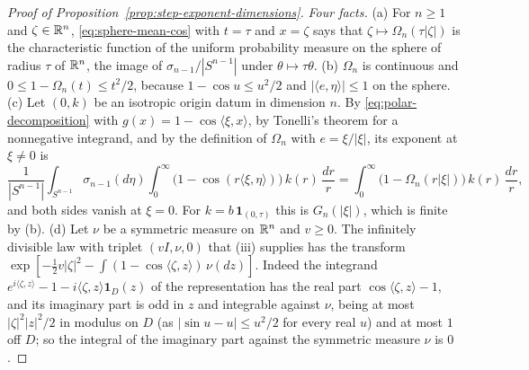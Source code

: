 \begin{proof}[Proof of Proposition~\ref{prop:step-exponent-dimensions}]
\emph{Four facts.} (a) For $n \ge 1$ and $\zeta \in \mathbb{R}^n$, \ref{eq:sphere-mean-cos} with
$t = \tau$ and $x = \zeta$ says that $\zeta \mapsto \Omega_n(\tau|\zeta|)$ is the characteristic
function of the uniform probability measure on the sphere of radius $\tau$ of $\mathbb{R}^n$, the image
of $\sigma_{n-1}/|S^{n-1}|$ under $\theta \mapsto \tau\theta$. (b) $\Omega_n$ is continuous and
$0 \le 1 - \Omega_n(t) \le t^2/2$, because $1 - \cos u \le u^2/2$ and
$|\langle e,\eta\rangle| \le 1$ on the sphere. (c) Let $(0,k)$ be an isotropic origin datum in
dimension $n$. By \ref{eq:polar-decomposition} with $g(x) = 1 - \cos\langle\xi,x\rangle$, by
Tonelli's theorem for a nonnegative integrand, and by the definition of $\Omega_n$ with
$e = \xi/|\xi|$, its exponent at $\xi \ne 0$ is
\[
  \frac{1}{|S^{n-1}|}\int_{S^{n-1}}\sigma_{n-1}(d\eta)\int_0^\infty
     \bigl(1 - \cos(r\langle\xi,\eta\rangle)\bigr)\,k(r)\,\frac{dr}{r}
   = \int_0^\infty \bigl(1 - \Omega_n(r|\xi|)\bigr)\,k(r)\,\frac{dr}{r} ,
\]
and both sides vanish at $\xi = 0$. For $k = b\,\mathbf 1_{(0,\tau)}$ this is $G_n(|\xi|)$, which
is finite by (b). (d) Let $\nu$ be a symmetric \Levy{} measure on $\mathbb{R}^n$ and $v \ge 0$. The
infinitely divisible law with triplet $(vI, \nu, 0)$ that (iii) supplies has the
transform $\exp[-\tfrac12 v|\zeta|^2 - \int(1 - \cos\langle\zeta,z\rangle)\,\nu(dz)]$. Indeed
the integrand $e^{i\langle\zeta,z\rangle} - 1 - i\langle\zeta,z\rangle\mathbf 1_D(z)$ of the
representation has the real part $\cos\langle\zeta,z\rangle - 1$, and its imaginary part is odd
in $z$ and integrable against $\nu$, being at most $|\zeta|^2|z|^2/2$ in modulus on $D$ (as
$|\sin u - u| \le u^2/2$ for every real $u$) and at most $1$ off $D$; so the integral of the
imaginary part against the symmetric measure $\nu$ is $0$.


\end{proof}
